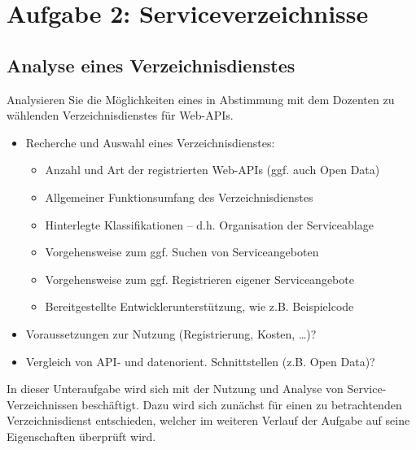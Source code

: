 \documentclass[notitlepage, hidelinks]{article}
\begin{document}
\section{Aufgabe 2: Serviceverzeichnisse}
\subsection{Analyse eines Verzeichnisdienstes}
Analysieren Sie die Möglichkeiten eines in Abstimmung mit dem Dozenten zu wählenden Verzeichnisdienstes für Web-APIs.
\begin{itemize}
\item Recherche und Auswahl eines Verzeichnisdienstes:
\begin{itemize}
\item Anzahl und Art der registrierten Web-APIs (ggf. auch Open Data)
\item Allgemeiner Funktionsumfang des Verzeichnisdienstes
\item Hinterlegte Klassifikationen – d.h. Organisation der Serviceablage
\item Vorgehensweise zum ggf. Suchen von Serviceangeboten
\item Vorgehensweise zum ggf. Registrieren eigener Serviceangebote
\item Bereitgestellte Entwicklerunterstützung, wie z.B. Beispielcode
\end{itemize}
\item Voraussetzungen zur Nutzung (Registrierung, Kosten, …)?
\item Vergleich von API- und datenorient. Schnittstellen (z.B. Open Data)?
\end{itemize}

In dieser Unteraufgabe wird sich mit der Nutzung und Analyse von Service-Verzeichnissen beschäftigt. Dazu wird sich zunächst für einen zu betrachtenden Verzeichnisdienst entschieden, welcher im weiteren Verlauf der Aufgabe auf seine Eigenschaften überprüft wird.
\end{document}
